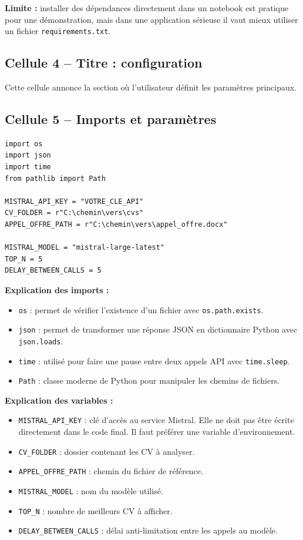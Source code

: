 \documentclass[12pt,a4paper]{article}
\begin{document}
\textbf{Limite :} installer des dépendances directement dans un notebook est pratique pour une démonstration, mais dans une application sérieuse il vaut mieux utiliser un fichier \texttt{requirements.txt}.

\subsection{Cellule 4 -- Titre : configuration}

Cette cellule annonce la section où l'utilisateur définit les paramètres principaux.

\subsection{Cellule 5 -- Imports et paramètres}

\begin{lstlisting}[style=pythonstyle]
import os
import json
import time
from pathlib import Path

MISTRAL_API_KEY = "VOTRE_CLE_API"
CV_FOLDER = r"C:\chemin\vers\cvs"
APPEL_OFFRE_PATH = r"C:\chemin\vers\appel_offre.docx"

MISTRAL_MODEL = "mistral-large-latest"
TOP_N = 5
DELAY_BETWEEN_CALLS = 5
\end{lstlisting}

\textbf{Explication des imports :}
\begin{itemize}
  \item \texttt{os} : permet de vérifier l'existence d'un fichier avec \texttt{os.path.exists}.
  \item \texttt{json} : permet de transformer une réponse JSON en dictionnaire Python avec \texttt{json.loads}.
  \item \texttt{time} : utilisé pour faire une pause entre deux appels API avec \texttt{time.sleep}.
  \item \texttt{Path} : classe moderne de Python pour manipuler les chemins de fichiers.
\end{itemize}

\textbf{Explication des variables :}
\begin{itemize}
  \item \texttt{MISTRAL\_API\_KEY} : clé d'accès au service Mistral. Elle ne doit pas être écrite directement dans le code final. Il faut préférer une variable d'environnement.
  \item \texttt{CV\_FOLDER} : dossier contenant les CV à analyser.
  \item \texttt{APPEL\_OFFRE\_PATH} : chemin du fichier de référence.
  \item \texttt{MISTRAL\_MODEL} : nom du modèle utilisé.
  \item \texttt{TOP\_N} : nombre de meilleurs CV à afficher.
  \item \texttt{DELAY\_BETWEEN\_CALLS} : délai anti-limitation entre les appels au modèle.
\end{itemize}
\end{document}

